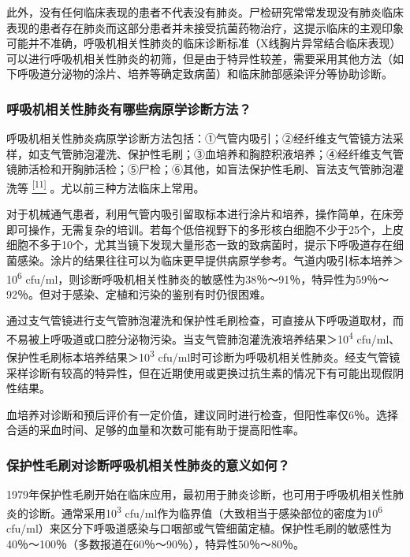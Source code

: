 此外，没有任何临床表现的患者不代表没有肺炎。尸检研究常常发现没有肺炎临床表现的患者存在肺炎而这部分患者并未接受抗菌药物治疗，这提示临床的主观印象可能并不准确，呼吸机相关性肺炎的临床诊断标准（X线胸片异常结合临床表现）可以进行呼吸机相关性肺炎的初筛，但是由于特异性较差，需要采用其他方法（如下呼吸道分泌物的涂片、培养等确定致病菌）和临床肺部感染评分等协助诊断。

\subsubsection{呼吸机相关性肺炎有哪些病原学诊断方法？}

呼吸机相关性肺炎病原学诊断方法包括：①气管内吸引；②经纤维支气管镜方法采样，如支气管肺泡灌洗、保护性毛刷；③血培养和胸腔积液培养；④经纤维支气管镜肺活检和开胸肺活检；⑤尸检；⑥其他，如盲法保护性毛刷、盲法支气管肺泡灌洗等
\protect\hyperlink{text00014.htmlux5cux23ch11-13}{\textsuperscript{{[}11{]}}}
。尤以前三种方法临床上常用。

对于机械通气患者，利用气管内吸引留取标本进行涂片和培养，操作简单，在床旁即可操作，无需复杂的培训。若每个低倍视野下的多形核白细胞不少于25个，上皮细胞不多于10个，尤其当镜下发现大量形态一致的致病菌时，提示下呼吸道存在细菌感染。涂片的结果往往可以为临床更早提供病原学参考。气道内吸引标本培养＞10\textsuperscript{6}
cfu/ml，则诊断呼吸机相关性肺炎的敏感性为38％～91％，特异性为59％～92％。但对于感染、定植和污染的鉴别有时仍很困难。

通过支气管镜进行支气管肺泡灌洗和保护性毛刷检查，可直接从下呼吸道取材，而不易被上呼吸道或口腔分泌物污染。当支气管肺泡灌洗液培养结果＞10\textsuperscript{4}
cfu/ml、保护性毛刷标本培养结果＞10\textsuperscript{3}
cfu/ml时可诊断为呼吸机相关性肺炎。经支气管镜采样诊断有较高的特异性，但在近期使用或更换过抗生素的情况下有可能出现假阴性结果。

血培养对诊断和预后评价有一定价值，建议同时进行检查，但阳性率仅6％。选择合适的采血时间、足够的血量和次数可能有助于提高阳性率。

\subsubsection{保护性毛刷对诊断呼吸机相关性肺炎的意义如何？}

1979年保护性毛刷开始在临床应用，最初用于肺炎诊断，也可用于呼吸机相关性肺炎的诊断。通常采用10\textsuperscript{3}
cfu/ml作为临界值（大致相当于感染部位的密度为10\textsuperscript{6}
cfu/ml）来区分下呼吸道感染与口咽部或气管细菌定植。保护性毛刷的敏感性为40％～100％（多数报道在60％～90％），特异性50％～80％。

